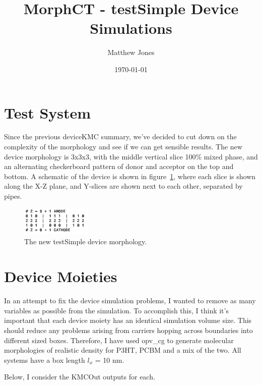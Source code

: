 \documentclass[12pt]{article}
\title{MorphCT - testSimple Device Simulations}
\author{Matthew Jones}
\date{\today}
\begin{document}
\maketitle


\section{Test System}

Since the previous deviceKMC summary, we've decided to cut down on the complexity of the morphology and see if we can get sensible results.
The new device morphology is 3x3x3, with the middle vertical slice 100\% mixed phase, and an alternating checkerboard pattern of donor and acceptor on the top and bottom.
A schematic of the device is shown in figure~\ref{fig:device}, where each slice is shown along the X-Z plane, and Y-slices are shown next to each other, separated by pipes.


\begin{figure}[h!]\centering
	\includegraphics[width=0.3\textwidth]{Figures/device.png}
    \caption{The new testSimple device morphology.}
	\label{fig:device}
\end{figure}


\section{Device Moieties}

In an attempt to fix the device simulation problems, I wanted to remove as many variables as possible from the simulation.
To accomplish this, I think it's important that each device moiety has an identical simulation volume size. This should reduce any problems arising from carriers hopping across boundaries into different sized boxes.
Therefore, I have used opv\_cg to generate molecular morphologies of realistic density for P3HT, PCBM and a mix of the two.
All systems have a box length $l_{x}$ = 10 nm.


Below, I consider the KMCOut outputs for each.
\end{document}
